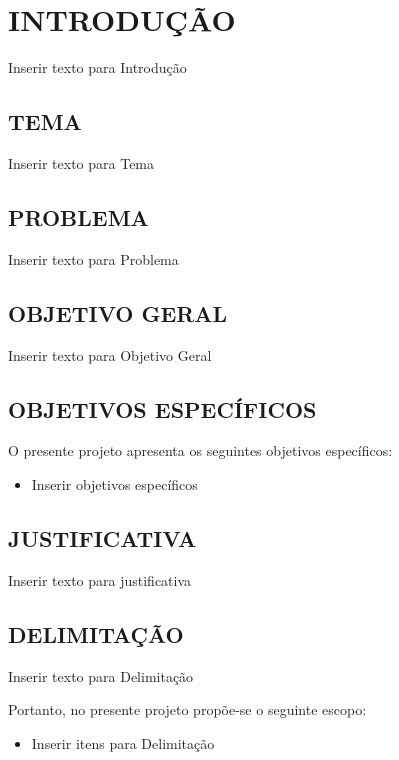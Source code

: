 \newpage

\section{INTRODUÇÃO}
\label{sec:introdução}
Inserir texto para Introdução

\subsection{TEMA}
\label{subsec:tema}
Inserir texto para Tema


\subsection{PROBLEMA}
\label{subsec:problema}
Inserir texto para Problema


\subsection{OBJETIVO GERAL}
\label{subsec:objetivo-geral}
Inserir texto para Objetivo Geral

\subsection{OBJETIVOS ESPECÍFICOS}
\label{subsec:objetivos-específicos}
O presente projeto apresenta os seguintes objetivos específicos:
\begin{itemize}
	\item Inserir objetivos específicos
\end{itemize}

\subsection{JUSTIFICATIVA}
\label{subsec:justificativa}
Inserir texto para justificativa


\subsection{DELIMITAÇÃO}
\label{subsec:delimitação}
Inserir texto para Delimitação

Portanto, no presente projeto propõe-se o seguinte escopo:

\begin{itemize}
	\item Inserir itens para Delimitação
\end{itemize}

